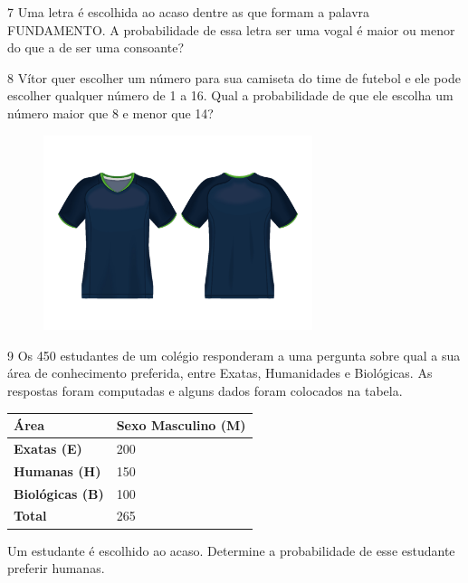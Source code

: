 \num{7} Uma letra é escolhida ao acaso dentre as que formam a palavra
FUNDAMENTO. A probabilidade de essa letra ser uma vogal é maior ou menor do que a de ser uma consoante?\enlargethispage{2\baselineskip}


\num{8} Vítor quer escolher um número para sua camiseta do time de futebol e ele
pode escolher qualquer número de 1 a 16. Qual a probabilidade de que ele
escolha um número maior que 8 e menor que 14?

\begin{figure}[htpb!]
\centering
\includegraphics[width=0.7\textwidth]{./media/image75d.png}
\end{figure}


\num{9} Os 450 estudantes de um colégio responderam a uma pergunta sobre qual a
sua área de conhecimento preferida, entre Exatas, Humanidades e
Biológicas. As respostas foram computadas e alguns dados foram colocados
na tabela.

\vspace{2ex}

\begin{longtable}[]{@{}ll@{}}
\toprule
\hline
\textbf{Área} & \textbf{Sexo Masculino (M)}\tabularnewline
\hline
\textbf{Exatas (E)} & 200\tabularnewline
\hline
\textbf{Humanas (H)} & 150\tabularnewline
\hline
\textbf{Biológicas (B)} & 100\tabularnewline
\hline
\textbf{Total} & 265\tabularnewline
\hline
\bottomrule
\end{longtable}

\pagebreak
Um estudante é escolhido ao acaso. Determine a probabilidade de esse
estudante preferir humanas.

